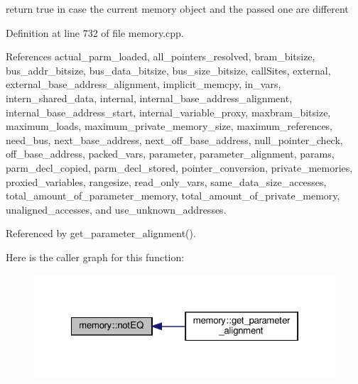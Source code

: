 return true in case the current memory object and the passed one are different 



Definition at line 732 of file memory.\+cpp.



References actual\+\_\+parm\+\_\+loaded, all\+\_\+pointers\+\_\+resolved, bram\+\_\+bitsize, bus\+\_\+addr\+\_\+bitsize, bus\+\_\+data\+\_\+bitsize, bus\+\_\+size\+\_\+bitsize, call\+Sites, external, external\+\_\+base\+\_\+address\+\_\+alignment, implicit\+\_\+memcpy, in\+\_\+vars, intern\+\_\+shared\+\_\+data, internal, internal\+\_\+base\+\_\+address\+\_\+alignment, internal\+\_\+base\+\_\+address\+\_\+start, internal\+\_\+variable\+\_\+proxy, maxbram\+\_\+bitsize, maximum\+\_\+loads, maximum\+\_\+private\+\_\+memory\+\_\+size, maximum\+\_\+references, need\+\_\+bus, next\+\_\+base\+\_\+address, next\+\_\+off\+\_\+base\+\_\+address, null\+\_\+pointer\+\_\+check, off\+\_\+base\+\_\+address, packed\+\_\+vars, parameter, parameter\+\_\+alignment, params, parm\+\_\+decl\+\_\+copied, parm\+\_\+decl\+\_\+stored, pointer\+\_\+conversion, private\+\_\+memories, proxied\+\_\+variables, rangesize, read\+\_\+only\+\_\+vars, same\+\_\+data\+\_\+size\+\_\+accesses, total\+\_\+amount\+\_\+of\+\_\+parameter\+\_\+memory, total\+\_\+amount\+\_\+of\+\_\+private\+\_\+memory, unaligned\+\_\+accesses, and use\+\_\+unknown\+\_\+addresses.



Referenced by get\+\_\+parameter\+\_\+alignment().

Here is the caller graph for this function\+:
\nopagebreak
\begin{figure}[H]
\begin{center}
\leavevmode
\includegraphics[width=322pt]{d8/d99/classmemory_a08892c0a65916344ca6b744256d764d7_icgraph}
\end{center}
\end{figure}
\mbox{\label{classmemory_ad407ba2bf162ece359a8254a3d23db32}} 
